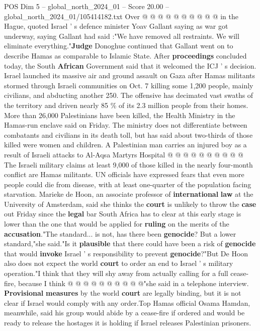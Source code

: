 \begin{textsample}{POS Dim 5 – global\_north\_2024\_01 – Score 20.00 – global\_north\_2024\_01/105414182.txt}
Over @ @ @ @ @ @ @ @ @ @ in the Hague, quoted Israel ' s defence minister Yoav Gallant saying as war got underway, saying Gallant had said :"We have removed all restraints.
We will eliminate everything."\textbf{Judge} Donoghue continued that Gallant went on to describe Hamas as comparable to Islamic State.
After \textbf{proceedings} concluded today, the South \textbf{African} Government said that it welcomed the ICJ ' s decision.
Israel launched its massive air and ground assault on Gaza after Hamas militants stormed through Israeli communities on Oct. 7 killing some 1,200 people, mainly civilians, and abducting another 250.
The offensive has decimated vast swaths of the territory and driven nearly 85 \% of its 2.3 million people from their homes.
More than 26,000 Palestinians have been killed, the Health Ministry in the Hamas-run enclave said on Friday.
The ministry does not differentiate between combatants and civilians in its death toll, but has said about two-thirds of those killed were women and children.
A Palestinian man carries an injured boy as a result of Israeli attacks to Al-Aqsa Martyrs Hospital @ @ @ @ @ @ @ @ @ @ The Israeli military claims at least 9,000 of those killed in the nearly four-month conflict are Hamas militants.
UN officials have expressed fears that even more people could die from disease, with at least one-quarter of the population facing starvation.
Marieke de Hoon, an associate professor of \textbf{international} \textbf{law} at the University of Amsterdam, said she thinks the \textbf{court} is unlikely to throw the \textbf{case} out Friday since the \textbf{legal} bar South Africa has to clear at this early stage is lower than the one that would be applied for \textbf{ruling} on the merits of the \textbf{accusation}."The standard... is not, has there been \textbf{genocide}?
But a lower standard,"she said."Is it \textbf{plausible} that there could have been a risk of \textbf{genocide} that would \textbf{invoke} Israel ' s responsibility to prevent \textbf{genocide}?"But De Hoon also does not expect the world \textbf{court} to order an end to Israel ' s military operation."I think that they will shy away from actually calling for a full cease-fire, because I think @ @ @ @ @ @ @ @ @ @"she said in a telephone interview. \textbf{Provisional} \textbf{measures} by the world \textbf{court} are legally binding, but it is not clear if Israel would comply with any order.Top Hamas official Osama Hamdan, meanwhile, said his group would abide by a cease-fire if ordered and would be ready to release the hostages it is holding if Israel releases Palestinian prisoners.

\end{textsample}
